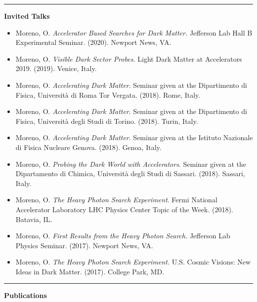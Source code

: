 \documentclass[11pt]{article}
\newcommand{\cvsection}[1] {
    \noindent
    \textcolor{indigodye}{\rule{.15\textwidth}{.1in} \hspace{0.01 \textwidth} \textbf{\Large{#1}}} \newline 
}
\begin{document}
    \cvsection{Invited Talks}
        \vspace{-11pt}
        \begin{itemize}[label=\textcolor{indigodye}{$\circ$}, noitemsep, nolistsep, leftmargin=.03\textwidth]
            \item Moreno, O. \emph{Accelerator Based Searches for Dark Matter.}
                  Jefferson Lab Hall B Experimental Seminar. (2020). Newport News, VA.
            \item Moreno, O. \emph{Visible Dark Sector Probes.}
                  Light Dark Matter at Accelerators 2019. (2019). Venice, Italy. 
            \item Moreno, O. \emph{Accelerating Dark Matter}. 
                  Seminar given at the Dipartimento di Fisica, Università di Roma Tor Vergata.
                  (2018). Rome, Italy.
            \item Moreno, O. \emph{Accelerating Dark Matter}. 
                  Seminar given at the Dipartimento di Fisica, Università degli Studi di Torino.
                  (2018). Turin, Italy.  
            \item Moreno, O. \emph{Accelerating Dark Matter}. 
                  Seminar given at the Istituto Nazionale di Fisica Nucleare Genova.
                  (2018). Genoa, Italy. 
            \item Moreno, O. \emph{Probing the Dark World with Accelerators}. 
                  Seminar given at the Dipartamento di Chimica, Università degli Studi di Sassari.
                  (2018). Sassari, Italy. 
            \item Moreno, O. \emph{The Heavy Photon Search Experiment}. 
                  Fermi National Accelerator Laboratory LHC Physics Center Topic of the Week. (2018). Batavia, IL.
            \item Moreno, O. \emph{First Results from the Heavy Photon Search.}
                  Jefferson Lab Physics Seminar. (2017). Newport News, VA.
            \item Moreno, O. \emph{The Heavy Photon Search Experiment.}
                  U.S. Cosmic Visions: New Ideas in Dark Matter. (2017). College Park, MD.  
        \end{itemize}
        \vspace{11pt}

    \cvsection{Publications}
    \vspace{-22pt}
\end{document}

